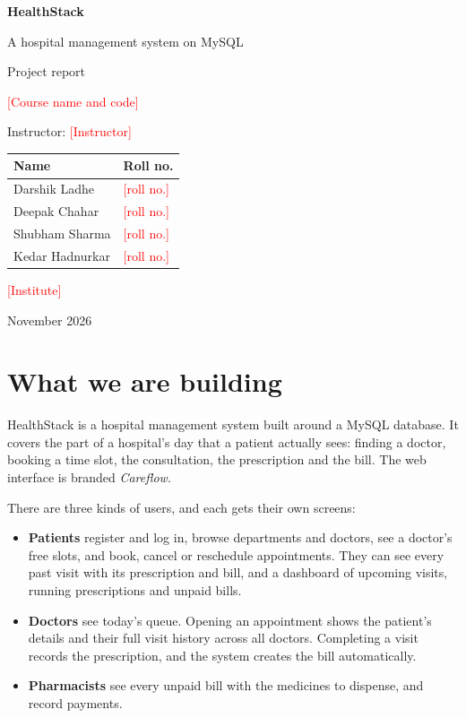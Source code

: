 \documentclass[11pt,a4paper]{article}
\newcommand{\CourseName}{\TBD{Course name and code}}
\newcommand{\Instructor}{\TBD{Instructor}}
\newcommand{\Institute}{\TBD{Institute}}
\newcommand{\TBD}[1]{\textcolor{red}{[#1]}}
\begin{document}
\begin{titlepage}
\centering
\vspace*{2.5cm}
{\Huge\bfseries HealthStack\par}
\vspace{0.4cm}
{\Large A hospital management system on MySQL\par}
\vspace{1.5cm}
{\large Project report\par}
\vspace{0.3cm}
{\large \CourseName\par}
\vspace{0.2cm}
{\large Instructor: \Instructor\par}
\vspace{2cm}
\begin{tabular}{ll}
\toprule
\textbf{Name} & \textbf{Roll no.} \\
\midrule
Darshik Ladhe   & \TBD{roll no.} \\
Deepak Chahar   & \TBD{roll no.} \\
Shubham Sharma  & \TBD{roll no.} \\
Kedar Hadnurkar & \TBD{roll no.} \\
\bottomrule
\end{tabular}
\vfill
{\large \Institute\par}
\vspace{0.2cm}
{\large November 2026\par}
\end{titlepage}

\tableofcontents
\newpage

\section{What we are building}

HealthStack is a hospital management system built around a MySQL database. It covers the part of a hospital's day that a patient actually sees: finding a doctor, booking a time slot, the consultation, the prescription and the bill. The web interface is branded \emph{Careflow}.

There are three kinds of users, and each gets their own screens:

\begin{itemize}
  \item \textbf{Patients} register and log in, browse departments and doctors, see a doctor's free slots, and book, cancel or reschedule appointments. They can see every past visit with its prescription and bill, and a dashboard of upcoming visits, running prescriptions and unpaid bills.
  \item \textbf{Doctors} see today's queue. Opening an appointment shows the patient's details and their full visit history across all doctors. Completing a visit records the prescription, and the system creates the bill automatically.
  \item \textbf{Pharmacists} see every unpaid bill with the medicines to dispense, and record payments.
\end{itemize}
\end{document}
